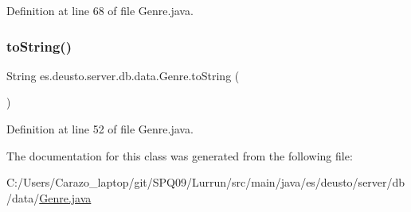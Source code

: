 Definition at line 68 of file Genre.\+java.

\mbox{\label{classes_1_1deusto_1_1server_1_1db_1_1data_1_1_genre_aeff531adb16e15f04a2f1a11b2b44af4}} 
\subsubsection{\texorpdfstring{to\+String()}{toString()}}
{\footnotesize\ttfamily String es.\+deusto.\+server.\+db.\+data.\+Genre.\+to\+String (\begin{DoxyParamCaption}{ }\end{DoxyParamCaption})}



Definition at line 52 of file Genre.\+java.



The documentation for this class was generated from the following file\+:\begin{DoxyCompactItemize}
\item 
C\+:/\+Users/\+Carazo\+\_\+laptop/git/\+S\+P\+Q09/\+Lurrun/src/main/java/es/deusto/server/db/data/\hyperlink{_genre_8java}{Genre.\+java}\end{DoxyCompactItemize}
